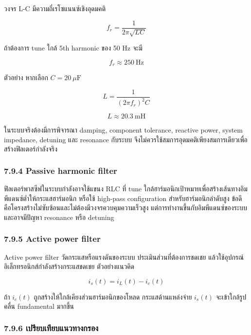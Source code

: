 วงจร L-C มีความถี่เรโซแนนซ์เชิงอุดมคติ

\[
f_r=\frac{1}{2\pi\sqrt{LC}}
\]

ถ้าต้องการ tune ใกล้ 5th harmonic ของ 50 Hz จะมี

\[
f_r\approx250\ \text{Hz}
\]

ตัวอย่าง หากเลือก $C=20\ \mu\mathrm{F}$

\[
L=\frac{1}{(2\pi f_r)^2C}
\]

\[
L\approx20.3\ \text{mH}
\]

ในระบบจริงต้องมีการพิจารณา damping, component tolerance, reactive power, system impedance, detuning และ resonance กับระบบ จึงไม่ควรใช้สมการอุดมคติเพียงสมการเดียวเพื่อสร้างฟิลเตอร์กำลังจริง

\subsubsection{7.9.4 Passive harmonic filter}

ฟิลเตอร์พาสซีฟในระบบกำลังอาจใช้แขนง RLC ที่ tune ใกล้ฮาร์มอนิกเป้าหมายเพื่อสร้างเส้นทางอิมพีแดนซ์ต่ำให้กระแสฮาร์มอนิก หรือใช้ high-pass configuration สำหรับฮาร์มอนิกลำดับสูง ข้อดีคือโครงสร้างไม่ซับซ้อนและไม่ต้องมีวงจรควบคุมความเร็วสูง แต่การทำงานขึ้นกับอิมพีแดนซ์ของระบบและอาจมีปัญหา resonance หรือ detuning

\subsubsection{7.9.5 Active power filter}

Active power filter วัดกระแสหรือแรงดันของระบบ ประเมินส่วนที่ต้องการชดเชย แล้วใช้อุปกรณ์อิเล็กทรอนิกส์กำลังสร้างกระแสชดเชย ตัวอย่างแนวคิด

\[
i_s(t)=i_L(t)-i_c(t)
\]

ถ้า $i_c(t)$ ถูกสร้างให้ใกล้เคียงส่วนฮาร์มอนิกของโหลด กระแสด้านแหล่งจ่าย $i_s(t)$ จะเข้าใกล้รูปคลื่น fundamental มากขึ้น

\subsubsection{7.9.6 เปรียบเทียบแนวทางกรอง}

